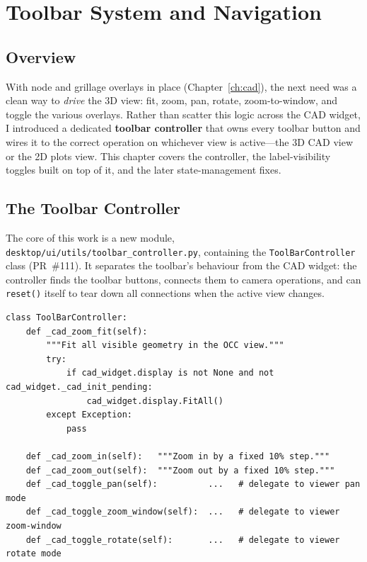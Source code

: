 \chapter{Toolbar System and Navigation}
\label{ch:toolbar}


\section{Overview}
With node and grillage overlays in place (Chapter~\ref{ch:cad}), the next need was a clean way
to \emph{drive} the 3D view: fit, zoom, pan, rotate, zoom-to-window, and toggle the various
overlays. Rather than scatter this logic across the CAD widget, I introduced a dedicated
\textbf{toolbar controller} that owns every toolbar button and wires it to the correct
operation on whichever view is active---the 3D CAD view or the 2D plots view. This chapter
covers the controller, the label-visibility toggles built on top of it, and the later
state-management fixes.

\section{The Toolbar Controller}
The core of this work is a new module,
\texttt{desktop/ui/utils/toolbar\_controller.py}, containing the
\texttt{ToolBarController} class (PR~\#111). It separates the toolbar's behaviour from the CAD
widget: the controller finds the toolbar buttons, connects them to camera operations, and can
\texttt{reset()} itself to tear down all connections when the active view changes.

\begin{lstlisting}[caption={Camera operations wired by the controller (\texttt{toolbar\_controller.py}).},label={lst:tbctrl}]
class ToolBarController:
    def _cad_zoom_fit(self):
        """Fit all visible geometry in the OCC view."""
        try:
            if cad_widget.display is not None and not cad_widget._cad_init_pending:
                cad_widget.display.FitAll()
        except Exception:
            pass

    def _cad_zoom_in(self):   """Zoom in by a fixed 10% step."""
    def _cad_zoom_out(self):  """Zoom out by a fixed 10% step."""
    def _cad_toggle_pan(self):          ...   # delegate to viewer pan mode
    def _cad_toggle_zoom_window(self):  ...   # delegate to viewer zoom-window
    def _cad_toggle_rotate(self):       ...   # delegate to viewer rotate mode
\end{lstlisting}

